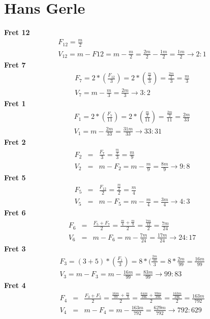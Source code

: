 \section{Hans Gerle}
\textbf{Fret 12}
\begin{eqnarray*}
F_{12} =
    \frac{m}{2} \\
V_{12} =
    m - F{12} =
    m - \frac{m}{2} =
    \frac{2m}{2} - \frac{1m}{2} =
    \frac{1m}{2}
    \to 2:1
\end{eqnarray*}
\textbf{Fret 7}
\begin{eqnarray*}
F_{7} =
    2 * ( \frac{F_{12}}{3} ) =
    2 * ( \frac{\frac{m}{2}}{3} ) =
    \frac{\frac{2m}{2}}{3} =
    \frac{m}{3} \\
    V_{7} = m - \frac{m}{3} = \frac{2m}{3} \to 3:2
\end{eqnarray*}
\textbf{Fret 1}
\begin{eqnarray*}
F_{1} =
    2 * ( \frac{F_{7}}{11} ) =
    2 * ( \frac{\frac{m}{3}}{11} ) =
    \frac{\frac{2m}{3}}{11} =
    \frac{2m}{33} \\
V_{1} =
    m - \frac{2m}{33} =
    \frac{31m}{33}
    \to 33:31
\end{eqnarray*}
\textbf{Fret 2}
\begin{eqnarray*}
    F_{2}
        &=& \frac{F_{7}}{3}
        = \frac{\frac{m}{3}}{3}
        = \frac{m}{9} \\
    V_{2}
        &=& m - F_{2}
        = m - \frac{m}{9}
        = \frac{8m}{9}
        \to 9:8
\end{eqnarray*}
\textbf{Fret 5}
\begin{eqnarray*}\label{Gr-5}
    F_{5}
        &=& \frac{F_{12}}{2}
        = \frac{\frac{m}{2}}{2}
        = \frac{m}{4} \\
    V_{5}
        &=& m - F_{5}
        = m - \frac{m}{4}
        = \frac{3m}{4}
        \to 4:3
\end{eqnarray*}
\textbf{Fret 6}
\begin{eqnarray*}
    F_{6}
        &=& \frac{F_{5} + F_{7}}{2}
        = \frac{\frac{m}{4} + \frac{m}{3}}{2}
        = \frac{\frac{7m}{12}}{2}
        = \frac{7m}{24} \\
    V_{6}
        &=& m - F_{6}
        = m - \frac{7m}{24}
        = \frac{17m}{24}
        \to 24:17
\end{eqnarray*}
\textbf{Fret 3}
\begin{eqnarray*}
F_{3} =
    (3 + 5) * (\frac{F_{1}}{3}) =
    8 * (\frac{\frac{2m}{33}}{3} =
    8 * \frac{2m}{99} =
    \frac{16m}{99} \\
V_{3} =
    m - F_{3} =
    m - \frac{16m}{99} = \frac{83m}{99}
    \to 99:83
\end{eqnarray*}
\textbf{Fret 4}
\begin{eqnarray*}
    F_{4}
        &=& \frac{F_{3} + F_{5}}{2}
        = \frac{\frac{16m}{99} + \frac{m}{9}}{2}
        = \frac{\frac{64m}{396} + \frac{99m}{396}}{2}
        = \frac{\frac{163m}{396}}{2}
        = \frac{163m}{792} \\
    V_{4}
        &=& m - F_{4}
        = m - \frac{163m}{792}
        = \frac{629m}{792}
        \to 792:629
\end{eqnarray*}

